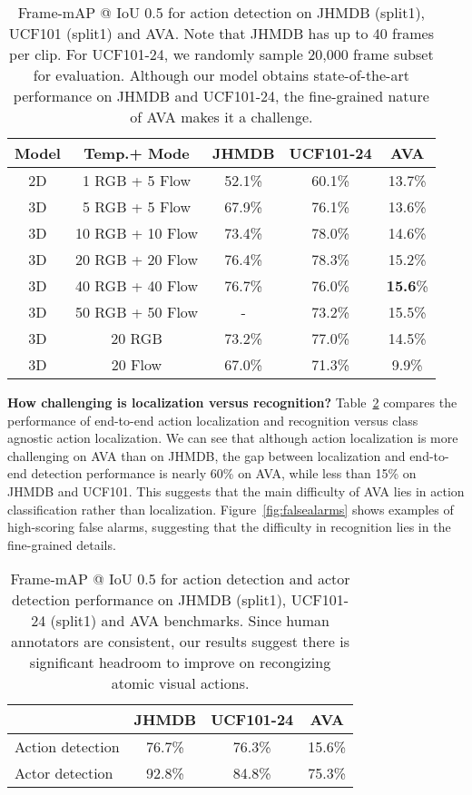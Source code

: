 \documentclass[10pt,twocolumn,letterpaper]{article}
\begin{document}
\begin{table}
\footnotesize
\centering
\begin{tabular}{c|c|c|c|c}
Model & Temp.+ Mode & JHMDB & UCF101-24 & AVA \\
\hline
2D & 1 RGB + 5 Flow & 52.1\% & 60.1\% & 13.7\% \\
3D & 5 RGB + 5 Flow & 67.9\% & 76.1\% & 13.6\% \\
3D & 10 RGB + 10 Flow & 73.4\% & 78.0\% & 14.6\% \\
3D & 20 RGB + 20 Flow & 76.4\% & 78.3\% & 15.2\% \\
3D & 40 RGB + 40 Flow & 76.7\% & 76.0\% & \textbf{15.6}\% \\
3D & 50 RGB + 50 Flow & - & 73.2\% & 15.5\% \\
\hline
3D & 20 RGB & 73.2\% & 77.0\% & 14.5\% \\
3D & 20 Flow & 67.0\% & 71.3\% & 9.9\% \\
\end{tabular}
\caption{Frame-mAP @ IoU 0.5 for action detection on JHMDB (split1), UCF101 (split1) and AVA. Note that JHMDB has up to 40 frames per clip. For UCF101-24, we randomly sample 20,000 frame subset for evaluation. Although our model obtains state-of-the-art performance on JHMDB and UCF101-24, the fine-grained nature of AVA makes it a challenge.}
\label{tab:exp_ablations}
\vspace{-1em}
\end{table}

\noindent \textbf{How challenging is localization versus recognition?} Table~\ref{tab:localization_comparison} compares the performance of end-to-end action localization and recognition versus class agnostic action localization. We can see that although action localization is more challenging on AVA than on JHMDB, the gap between localization and end-to-end detection performance is nearly 60\% on AVA, while less than 15\% on JHMDB and UCF101. This suggests that the main difficulty of AVA lies in action classification rather than localization.  Figure~\ref{fig:falsealarms} shows examples of high-scoring false alarms, suggesting that the difficulty in recognition lies in the fine-grained details. 
 
\begin{table}[tbp]
\centering
\begin{tabular}{l|c|c|c}
& JHMDB & UCF101-24 & AVA \\
\hline
Action detection & 76.7\% & 76.3\% & 15.6\% \\
Actor detection & 92.8\% & 84.8\% & 75.3\% \\
\end{tabular}
\caption{Frame-mAP @ IoU 0.5  for action detection and actor detection performance on JHMDB (split1), UCF101-24 (split1) and AVA benchmarks. Since human annotators are consistent, our results suggest there is significant headroom to improve on recongizing atomic visual actions.}
\label{tab:localization_comparison}
\vspace{-1em}
\end{table}
\end{document}
